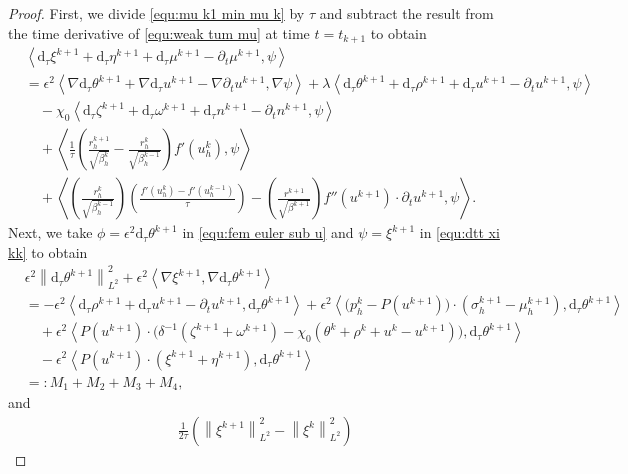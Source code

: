 \documentclass[11pt, reqno]{amsart}
\theoremstyle{definition}
\numberwithin{equation}{section}
\newcommand{\dtt}{\mathrm{d}_\tau}
\newcommand{\norm}[2]{\left\|{#1}\right\|_{#2}}
\newcommand{\inpro}[2]{\left\langle#1,#2\right\rangle}
\begin{document}
\begin{proof}
First, we divide \eqref{equ:mu k1 min mu k} by $\tau$ and subtract the result from the time derivative of \eqref{equ:weak tum mu} at time $t=t_{k+1}$ to obtain
\begin{align}\label{equ:dtt xi kk}
    &\inpro{\dtt \xi^{k+1}+ \dtt \eta^{k+1}+ \dtt \mu^{k+1} - \partial_t \mu^{k+1}}{\psi}
    \nonumber\\
    &=
    \epsilon^2 \inpro{\nabla \dtt \theta^{k+1}+ \nabla \dtt u^{k+1}- \nabla \partial_t u^{k+1}}{\nabla \psi} 
    +
    \lambda \inpro{\dtt \theta^{k+1} + \dtt \rho^{k+1} + \dtt u^{k+1}- \partial_t u^{k+1}}{\psi} 
    \nonumber\\
    &\quad
    -
    \chi_0 \inpro{\dtt \zeta^{k+1}+ \dtt \omega^{k+1} + \dtt n^{k+1}- \partial_t n^{k+1}}{\psi}
    \nonumber\\
    &\quad
    +
    \inpro{\frac{1}{\tau} \left(\frac{r_h^{k+1}}{\sqrt{\beta_h^k}} - \frac{r_h^k}{\sqrt{\beta_h^{k-1}}} \right) f'(u_h^k)}{\psi}
    \nonumber\\
    &\quad
    +
    \inpro{\left(\frac{r_h^k}{\sqrt{\beta_h^{k-1}}}\right) \left(\frac{f'(u_h^k)-f'(u_h^{k-1})}{\tau}\right) - \left(\frac{r^{k+1}}{\sqrt{\beta^{k+1}}} \right) f''(u^{k+1}) \cdot \partial_t u^{k+1}}{\psi}.
\end{align}
Next, we take $\phi=\epsilon^2 \dtt \theta^{k+1}$ in \eqref{equ:fem euler sub u} and $\psi=\xi^{k+1}$ in \eqref{equ:dtt xi kk} to obtain
\begin{align}\label{equ:eps dt theta 2}
    &\epsilon^2 \norm{\dtt \theta^{k+1}}{L^2}^2
    +
    \epsilon^2 \inpro{\nabla \xi^{k+1}}{\nabla \dtt \theta^{k+1}}
    \nonumber\\
    &=
    -\epsilon^2 \inpro{\dtt \rho^{k+1}+\dtt u^{k+1}-\partial_t u^{k+1}}{\dtt \theta^{k+1}}
    +
    \epsilon^2
	\inpro{\big(p_h^k-P(u^{k+1})\big)\cdot (\sigma_h^{k+1}-\mu_h^{k+1})}{\dtt \theta^{k+1}}
	\nonumber\\
	&\quad
	+
	\epsilon^2 \inpro{P(u^{k+1})\cdot \big(\delta^{-1}(\zeta^{k+1}+\omega^{k+1}) - \chi_0(\theta^k+\rho^k+u^k-u^{k+1})\big)}{\dtt \theta^{k+1}}
	\nonumber\\
	&\quad
	- \epsilon^2
    \inpro{P(u^{k+1})\cdot (\xi^{k+1}+ \eta^{k+1})}{\dtt \theta^{k+1}}
    \nonumber\\
    &=: M_1+M_2+M_3+M_4,
\end{align}
and
\begin{align}\label{equ:xi k min xi 2}
    &\frac{1}{2\tau} \left(\norm{\xi^{k+1}}{L^2}^2 - \norm{\xi^k}{L^2}^2 \right)

\end{align}
\end{proof}
\end{document}
